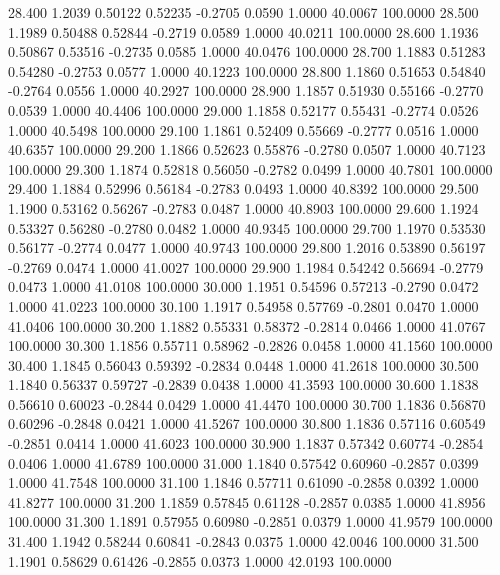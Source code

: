   28.400   1.2039   0.50122   0.52235  -0.2705   0.0590   1.0000  40.0067 100.0000
  28.500   1.1989   0.50488   0.52844  -0.2719   0.0589   1.0000  40.0211 100.0000
  28.600   1.1936   0.50867   0.53516  -0.2735   0.0585   1.0000  40.0476 100.0000
  28.700   1.1883   0.51283   0.54280  -0.2753   0.0577   1.0000  40.1223 100.0000
  28.800   1.1860   0.51653   0.54840  -0.2764   0.0556   1.0000  40.2927 100.0000
  28.900   1.1857   0.51930   0.55166  -0.2770   0.0539   1.0000  40.4406 100.0000
  29.000   1.1858   0.52177   0.55431  -0.2774   0.0526   1.0000  40.5498 100.0000
  29.100   1.1861   0.52409   0.55669  -0.2777   0.0516   1.0000  40.6357 100.0000
  29.200   1.1866   0.52623   0.55876  -0.2780   0.0507   1.0000  40.7123 100.0000
  29.300   1.1874   0.52818   0.56050  -0.2782   0.0499   1.0000  40.7801 100.0000
  29.400   1.1884   0.52996   0.56184  -0.2783   0.0493   1.0000  40.8392 100.0000
  29.500   1.1900   0.53162   0.56267  -0.2783   0.0487   1.0000  40.8903 100.0000
  29.600   1.1924   0.53327   0.56280  -0.2780   0.0482   1.0000  40.9345 100.0000
  29.700   1.1970   0.53530   0.56177  -0.2774   0.0477   1.0000  40.9743 100.0000
  29.800   1.2016   0.53890   0.56197  -0.2769   0.0474   1.0000  41.0027 100.0000
  29.900   1.1984   0.54242   0.56694  -0.2779   0.0473   1.0000  41.0108 100.0000
  30.000   1.1951   0.54596   0.57213  -0.2790   0.0472   1.0000  41.0223 100.0000
  30.100   1.1917   0.54958   0.57769  -0.2801   0.0470   1.0000  41.0406 100.0000
  30.200   1.1882   0.55331   0.58372  -0.2814   0.0466   1.0000  41.0767 100.0000
  30.300   1.1856   0.55711   0.58962  -0.2826   0.0458   1.0000  41.1560 100.0000
  30.400   1.1845   0.56043   0.59392  -0.2834   0.0448   1.0000  41.2618 100.0000
  30.500   1.1840   0.56337   0.59727  -0.2839   0.0438   1.0000  41.3593 100.0000
  30.600   1.1838   0.56610   0.60023  -0.2844   0.0429   1.0000  41.4470 100.0000
  30.700   1.1836   0.56870   0.60296  -0.2848   0.0421   1.0000  41.5267 100.0000
  30.800   1.1836   0.57116   0.60549  -0.2851   0.0414   1.0000  41.6023 100.0000
  30.900   1.1837   0.57342   0.60774  -0.2854   0.0406   1.0000  41.6789 100.0000
  31.000   1.1840   0.57542   0.60960  -0.2857   0.0399   1.0000  41.7548 100.0000
  31.100   1.1846   0.57711   0.61090  -0.2858   0.0392   1.0000  41.8277 100.0000
  31.200   1.1859   0.57845   0.61128  -0.2857   0.0385   1.0000  41.8956 100.0000
  31.300   1.1891   0.57955   0.60980  -0.2851   0.0379   1.0000  41.9579 100.0000
  31.400   1.1942   0.58244   0.60841  -0.2843   0.0375   1.0000  42.0046 100.0000
  31.500   1.1901   0.58629   0.61426  -0.2855   0.0373   1.0000  42.0193 100.0000
